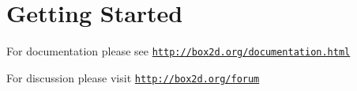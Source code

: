 \hypertarget{index_intro_sec}{}\section{Getting Started}\label{index_intro_sec}
For documentation please see \href{http://box2d.org/documentation.html}{\tt http\+://box2d.\+org/documentation.\+html}

For discussion please visit \href{http://box2d.org/forum}{\tt http\+://box2d.\+org/forum} 